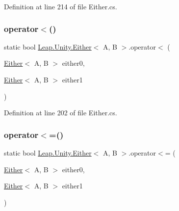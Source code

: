 Definition at line 214 of file Either.\+cs.

\mbox{\label{struct_leap_1_1_unity_1_1_either_ab37b777230207b8c28d6dd31a3973d31}} 
\subsubsection{\texorpdfstring{operator$<$()}{operator<()}}
{\footnotesize\ttfamily static bool \mbox{\hyperlink{struct_leap_1_1_unity_1_1_either}{Leap.\+Unity.\+Either}}$<$ A, B $>$.operator$<$ (\begin{DoxyParamCaption}\item[{\mbox{\hyperlink{struct_leap_1_1_unity_1_1_either}{Either}}$<$ A, B $>$}]{either0,  }\item[{\mbox{\hyperlink{struct_leap_1_1_unity_1_1_either}{Either}}$<$ A, B $>$}]{either1 }\end{DoxyParamCaption})\hspace{0.3cm}{\ttfamily [static]}}



Definition at line 202 of file Either.\+cs.

\mbox{\label{struct_leap_1_1_unity_1_1_either_a8f0100a083842f17c4fb7264168a98bd}} 
\subsubsection{\texorpdfstring{operator$<$=()}{operator<=()}}
{\footnotesize\ttfamily static bool \mbox{\hyperlink{struct_leap_1_1_unity_1_1_either}{Leap.\+Unity.\+Either}}$<$ A, B $>$.operator$<$= (\begin{DoxyParamCaption}\item[{\mbox{\hyperlink{struct_leap_1_1_unity_1_1_either}{Either}}$<$ A, B $>$}]{either0,  }\item[{\mbox{\hyperlink{struct_leap_1_1_unity_1_1_either}{Either}}$<$ A, B $>$}]{either1 }\end{DoxyParamCaption})\hspace{0.3cm}{\ttfamily [static]}}



